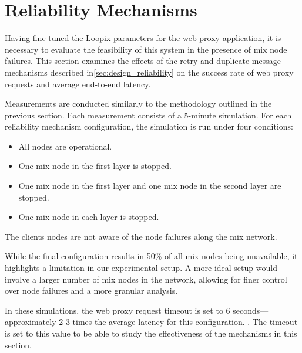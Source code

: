 \documentclass[a4paper,11pt,oneside]{report}
\begin{document}

\section{Reliability Mechanisms}
Having fine-tuned the Loopix parameters for the web proxy application, it is necessary to evaluate the feasibility of this system in the presence of mix node failures. This section examines the effects of the retry and duplicate message mechanisms described in\autoref{sec:design_reliability} on the success rate of web proxy requests and average end-to-end latency.

Measurements are conducted similarly to the methodology outlined in the previous section. Each measurement consists of a 5-minute simulation. For each reliability mechanism configuration, the simulation is run under four conditions:

\begin{itemize}
    \item All nodes are operational.
    \item One mix node in the first layer is stopped.
    \item One mix node in the first layer and one mix node in the second layer are stopped.
    \item One mix node in each layer is stopped.
\end{itemize}

The clients nodes are not aware of the node failures along the mix network.
    
While the final configuration results in 50\% of all mix nodes being unavailable, it highlights a limitation in our experimental setup. A more ideal setup would involve a larger number of mix nodes in the network, allowing for finer control over node failures and a more granular analysis.

In these simulations, the web proxy request timeout is set to 6 seconds—approximately 2-3 times the average latency for this configuration. . The timeout is set to this value to be able to study the effectiveness of the mechanisms in this section.
\end{document}
